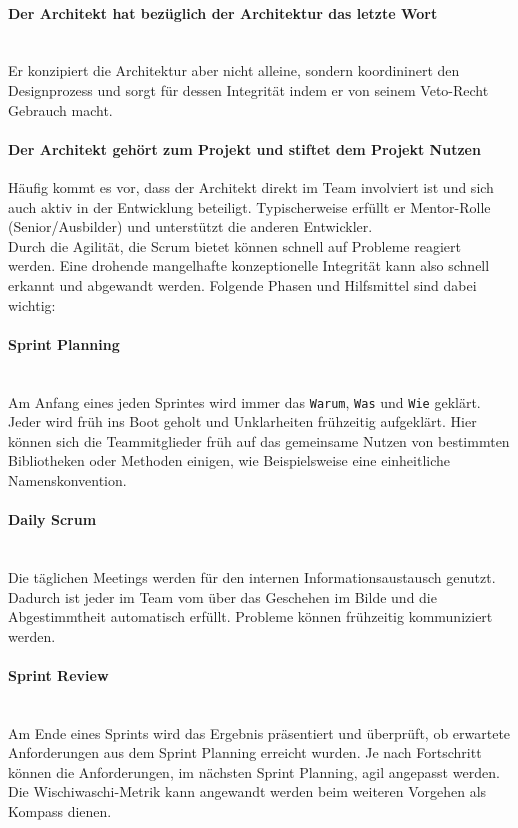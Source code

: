 \documentclass[a4paper, ngerman, 12pt, usenames, dvipsnames]{article}
\begin{document}
    \paragraph{Der Architekt hat bezüglich der Architektur das letzte Wort}\mbox{} \\
    Er konzipiert die Architektur aber nicht alleine, sondern koordininert den Designprozess und sorgt für dessen Integrität indem er von seinem Veto-Recht Gebrauch macht. 
    
    \paragraph{Der Architekt gehört zum Projekt und stiftet dem Projekt Nutzen}\mbox{} 
    Häufig kommt es vor, dass der Architekt direkt im Team involviert ist und sich auch aktiv in der Entwicklung beteiligt.
    Typischerweise erfüllt er Mentor-Rolle (Senior/Ausbilder) und unterstützt die anderen Entwickler.\\
    
    Durch die Agilität, die Scrum bietet können schnell auf Probleme reagiert werden. Eine drohende mangelhafte konzeptionelle Integrität kann also schnell erkannt und abgewandt werden.
    Folgende Phasen und Hilfsmittel sind dabei wichtig:

    \paragraph{Sprint Planning}\mbox{} \\
    Am Anfang eines jeden Sprintes wird immer das \texttt{Warum}, \texttt{Was} und \texttt{Wie} geklärt. 
    Jeder wird früh ins Boot geholt und Unklarheiten frühzeitig aufgeklärt.
    Hier können sich die Teammitglieder früh auf das gemeinsame Nutzen von bestimmten Bibliotheken oder Methoden einigen, wie Beispielsweise eine einheitliche Namenskonvention.
    \pagebreak
    \paragraph{Daily Scrum}\mbox{} \\
    Die täglichen Meetings werden für den internen Informationsaustausch genutzt.
    Dadurch ist jeder im Team vom über das Geschehen im Bilde und die Abgestimmtheit automatisch erfüllt.
    Probleme können frühzeitig kommuniziert werden.
    \paragraph{Sprint Review}\mbox{} \\
    Am Ende eines Sprints wird das Ergebnis präsentiert und überprüft, ob erwartete Anforderungen aus dem Sprint Planning erreicht wurden.
    Je nach Fortschritt können die Anforderungen, im nächsten Sprint Planning, agil angepasst werden. Die Wischiwaschi-Metrik kann angewandt werden beim weiteren Vorgehen als Kompass dienen.
\end{document}
